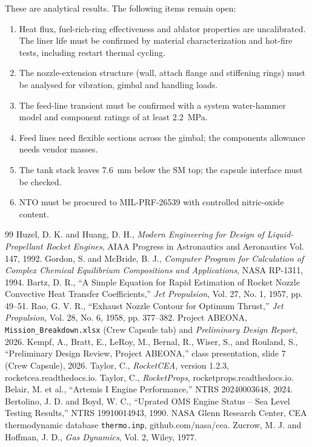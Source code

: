 \documentclass[10pt]{article}
\begin{document}
These are analytical results. The following items remain open:
\begin{enumerate}
\item Heat flux, fuel-rich-ring effectiveness and ablator properties are uncalibrated. The liner life must be
confirmed by material characterization and hot-fire tests, including restart thermal cycling.
\item The nozzle-extension structure (wall, attach flange and stiffening rings) must be analysed for vibration, gimbal
and handling loads.
\item The feed-line transient must be confirmed with a system water-hammer model and component ratings of at least
2.2~MPa.
\item Feed lines need flexible sections across the gimbal; the components allowance needs vendor masses.
\item The tank stack leaves 7.6~mm below the SM top; the capsule interface must be checked.
\item NTO must be procured to MIL-PRF-26539 with controlled nitric-oxide content.
\end{enumerate}

\begin{thebibliography}{99}\small
{} Huzel, D. K. and Huang, D. H., \emph{Modern Engineering for Design of Liquid-Propellant Rocket Engines}, AIAA Progress in Astronautics and Aeronautics Vol. 147, 1992.
 Gordon, S. and McBride, B. J., \emph{Computer Program for Calculation of Complex Chemical Equilibrium Compositions and Applications}, NASA RP-1311, 1994.
 Bartz, D. R., ``A Simple Equation for Rapid Estimation of Rocket Nozzle Convective Heat Transfer Coefficients,'' \emph{Jet Propulsion}, Vol. 27, No. 1, 1957, pp. 49--51.
 Rao, G. V. R., ``Exhaust Nozzle Contour for Optimum Thrust,'' \emph{Jet Propulsion}, Vol. 28, No. 6, 1958, pp. 377--382.
 Project ABEONA, \texttt{Mission\_Breakdown.xlsx} (Crew Capsule tab) and \emph{Preliminary Design Report}, 2026.
 Kempf, A., Bratt, E., LeRoy, M., Bernal, R., Wiser, S., and Rouland, S., ``Preliminary Design Review, Project ABEONA,'' class presentation, slide 7 (Crew Capsule), 2026.
 Taylor, C., \emph{RocketCEA}, version 1.2.3, rocketcea.readthedocs.io.
 Taylor, C., \emph{RocketProps}, rocketprops.readthedocs.io.
 Belair, M. et al., ``Artemis I Engine Performance,'' NTRS 20240003648, 2024.
 Bertolino, J. D. and Boyd, W. C., ``Uprated OMS Engine Status -- Sea Level Testing Results,'' NTRS 19910014943, 1990.
 NASA Glenn Research Center, CEA thermodynamic database \texttt{thermo.inp}, github.com/nasa/cea.
 Zucrow, M. J. and Hoffman, J. D., \emph{Gas Dynamics}, Vol. 2, Wiley, 1977.
\end{thebibliography}
\end{document}
